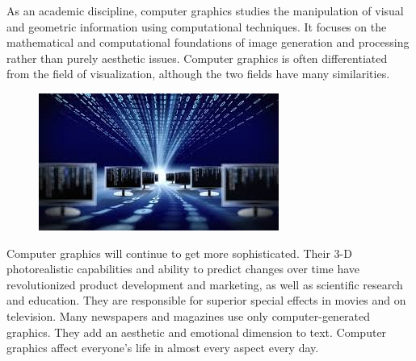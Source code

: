 \documentclass[a4paper]{article}
\begin{document}
As an academic discipline, computer graphics studies the manipulation of visual and geometric information using computational techniques. It focuses on the mathematical and computational foundations of image generation and processing rather than purely aesthetic issues. Computer graphics is often differentiated from the field of visualization, although the two fields have many similarities.
\begin{figure}[h]
\centering
\includegraphics{sg}
\end{figure}
Computer graphics will continue to get more sophisticated. Their 3-D photorealistic capabilities and ability to predict changes over time have revolutionized product development and marketing, as well as scientific research and education. They are responsible for superior special effects in movies and on television. Many newspapers and magazines use only computer-generated graphics. They add an aesthetic and emotional dimension to text. Computer graphics affect everyone's life in almost every aspect every day.
 
\end{document}
